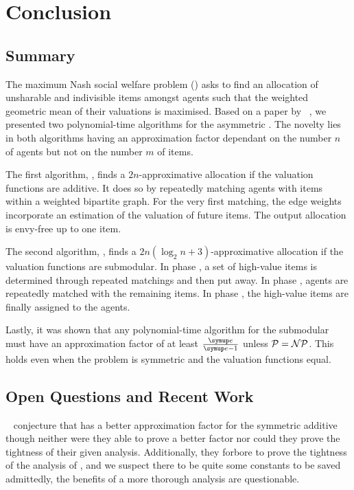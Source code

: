 \section{Conclusion}
\label{sec:conclusion}

\vspace{-0.5ex}
\subsection{Summary}
\label{subsec:conclusion:summary}

The maximum Nash social welfare problem (\NSW) asks to find an allocation of unsharable and indivisible items amongst agents such that the weighted geometric mean of their valuations is maximised.
Based on a paper by \citeauthor{APNSWuSVþUM}~\cite{APNSWuSVþUM}, we presented two polynomial-time algorithms for the asymmetric \NSW.
The novelty lies in both algorithms having an approximation factor dependant on the number \(n\) of agents but not on the number \(m\) of items.

The first algorithm, \SMatch, finds a \(2n\)-approximative allocation if the valuation functions are additive.
It does so by repeatedly matching agents with items within a weighted bipartite graph.
For the very first matching, the edge weights incorporate an estimation of the valuation of future items.
The output allocation is envy-free up to one item.

The second algorithm, \RepReMatch, finds a \(2n(\log_2 n + 3)\)-approximative allocation if the valuation functions are submodular.
In phase \phasei, a set of high-value items is determined through repeated matchings and then put away.
In phase \phaseii, agents are repeatedly matched with the remaining items.
In phase \phaseiii, the high-value items are finally assigned to the agents.

Lastly, it was shown that any polynomial-time algorithm for the submodular \NSW{} must have an approximation factor of at least \(\frac{\euler}{\euler - 1}\) unless \(\mathcal{P} = \mathcal{N\kern-0.025em P}\).
This holds even when the problem is symmetric and the valuation functions equal.

\subsection{Open Questions and Recent Work}
\label{subsec:conclusion:outlook}

~\cite{APNSWuSVþUM} conjecture that \SMatch{} has a better approximation factor for the symmetric additive \NSW{} though neither were they able to prove a better factor nor could they prove the tightness of their given analysis.
Additionally, they forbore to prove the tightness of the analysis of \RepReMatch{}, and we suspect there to be quite some constants to be saved \Dash admittedly, the benefits of a more thorough analysis are questionable.

